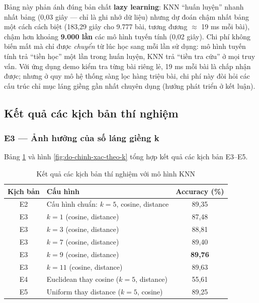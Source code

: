 Bảng này phản ánh đúng bản chất \textbf{lazy learning}: KNN ``huấn luyện'' nhanh nhất bảng (0,03 giây --- chỉ là ghi nhớ dữ liệu) nhưng dự đoán chậm nhất bảng một cách cách biệt (183,29 giây cho 9.777 bài, tương đương $\approx$ 19 ms mỗi bài), chậm hơn khoảng \textbf{9.000 lần} các mô hình tuyến tính (0,02 giây). Chi phí không biến mất mà chỉ được \textit{chuyển} từ lúc học sang mỗi lần sử dụng: mô hình tuyến tính trả ``tiền học'' một lần trong huấn luyện, KNN trả ``tiền tra cứu'' ở mọi truy vấn. Với ứng dụng demo kiểm tra từng bài riêng lẻ, 19 ms mỗi bài là chấp nhận được; nhưng ở quy mô hệ thống sàng lọc hàng triệu bài, chi phí này đòi hỏi các cấu trúc chỉ mục láng giềng gần nhất chuyên dụng (hướng phát triển ở kết luận).

\subsection{Kết quả các kịch bản thí nghiệm}

\subsubsection{E3 --- Ảnh hưởng của số láng giềng k}

Bảng \ref{tab:ket-qua-kich-ban} và hình \ref{fig:do-chinh-xac-theo-k} tổng hợp kết quả các kịch bản E3--E5.

\begin{table}[H]
\centering
\caption{Kết quả các kịch bản thí nghiệm với mô hình KNN}
\label{tab:ket-qua-kich-ban}
\begin{tabular}{|c|p{7.5cm}|c|}
\hline
\textbf{Kịch bản} & \textbf{Cấu hình} & \textbf{Accuracy (\%)} \\
\hline
E2 & Cấu hình chuẩn: $k = 5$, cosine, distance & 89,35 \\
\hline
E3 & $k = 1$ (cosine, distance) & 87,48 \\
\hline
E3 & $k = 3$ (cosine, distance) & 88,81 \\
\hline
E3 & $k = 7$ (cosine, distance) & 89,40 \\
\hline
E3 & $k = 9$ (cosine, distance) & \textbf{89,76} \\
\hline
E3 & $k = 11$ (cosine, distance) & 89,63 \\
\hline
E4 & Euclidean thay cosine ($k = 5$, distance) & 55,61 \\
\hline
E5 & Uniform thay distance ($k = 5$, cosine) & 89,25 \\
\hline
\end{tabular}
\end{table}

